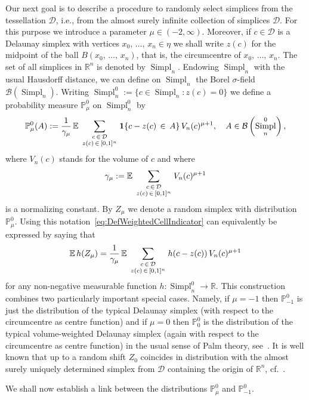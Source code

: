 \documentclass[AHL,Unicode,longabstracts,published]{cedram}
\newcommand{\R}{\mathbb{R}}
\newcommand{\EE}{\mathbb{E}\,}
\newcommand{\PP}{\mathbb{P}}
\newcommand{\dscr}{\mathcal{D}}
\DeclareMathOperator{\Simpl}{Simpl}
\newcommand{\tatop}[2]{\genfrac{}{}{0pt}{1}{#1}{#2}}
\begin{document}
Our next goal is to describe a procedure to randomly select simplices from the tessellation $\dscr$, i.e., from the almost surely infinite collection of simplices $\dscr$. For this purpose we introduce a parameter $\mu\in(-2,\infty)$. Moreover, if $c\in \dscr$ is a Delaunay simplex with vertices $x_0,\,\ldots,\,x_n\in\eta$ we shall write $z(c)$ for the midpoint of the ball $B(x_0,\,\ldots,\,x_n)$, that is, the circumcentre of $x_0,\,\ldots,\,x_n$. The set of all simplices in $\R^n$ is denoted by $\Simpl_n$. Endowing $\Simpl_n$ with the usual Hausdorff distance, we can define on $\Simpl_n$ the Borel $\sigma$-field $\mathcal{B}(\Simpl_n)$. Writing \linebreak$\Simpl_n^0:=\{c\in\Simpl_n:z(c)=0\}$ we define a probability measure $\PP_\mu^0$ on $\Simpl_n^0$ by
\begin{equation}\label{eq:DefWeightedCellIndicator}
\PP_\mu^0(A) := \frac{1}{\gamma_\mu}\,\EE\sum_{\tatop{c\,\in\,\dscr}{z(c)\,\in\,[0,1]^n}}{\bf 1}\{c-z(c)\,\in\,A\}\,V_n(c)^{\mu+1},\quad A\in\mathcal{B}\left(\Simpl_n^0\right),
\end{equation}
where $V_n(c)$ stands for the volume of $c$ and where
\[
\gamma_\mu := \EE\sum_{\tatop{c\,\in\, \dscr}{z(c)\,\in\,[0,1]^n}}V_n(c)^{\mu+1}
\]
is a normalizing constant. By $Z_\mu$ we denote a random simplex with distribution $\PP_\mu^0$. Using this notation~\eqref{eq:DefWeightedCellIndicator} can equivalently be expressed by saying that
\begin{equation}\label{eq:DefWeightedCellWithH}
\EE h(Z_\mu) = \frac{1}{\gamma_\mu}\,\EE\sum_{\tatop{c\,\in\,\dscr}{z(c)\,\in\,[0,1]^n}}h(c-z(c))\,V_n(c)^{\mu+1}
\end{equation}
for any non-negative measurable function $h:\Simpl_n^0\to\R$. This construction combines two particularly important special cases. Namely, if $\mu=-1$ then $\PP_{-1}^0$ is just the distribution of the typical Delaunay simplex (with respect to the circumcentre as centre function) and if $\mu=0$ then $\PP_{0}^0$ is the distribution of the typical volume-weighted Delaunay simplex (again with respect to the circumcentre as centre function) in the usual sense of Palm theory, see~\cite[Section~3.3]{SW08}. It is well known that up to a random shift $Z_0$ coincides in distribution with the almost surely uniquely determined simplex from $\dscr$ containing the origin of $\R^n$, cf.~\cite[Theorem~10.4.1]{SW08}.

We shall now establish a link between the distributions $\PP_\mu^0$ and $\PP_{-1}^0$.
\end{document}
